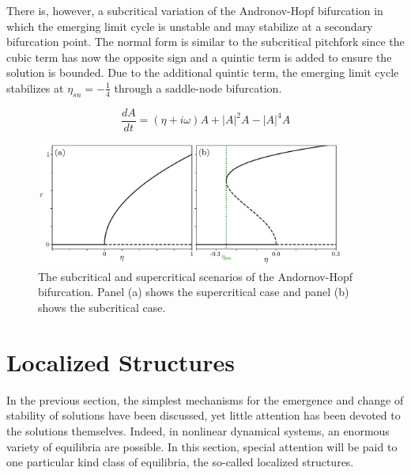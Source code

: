 There is, however, a subcritical variation
of the Andronov-Hopf bifurcation in which the emerging limit cycle is unstable and may stabilize at a secondary bifurcation point.
The normal form is similar to the subcritical pitchfork since the cubic term has now the opposite sign and a quintic term is added to ensure the solution is bounded.
Due to the additional quintic term, the emerging limit cycle stabilizes at $\eta_{sn} = -\frac14$ through
a saddle-node bifurcation.

\begin{equation}
    \dfrac{dA}{dt} = (\eta + i\omega) A + |A|^2 A - |A|^4A
\end{equation}

\begin{figure}[h]
    \centering
    \includegraphics[width=0.9\textwidth]{imagenes/framework/hopf_supersub.pdf}
    \caption{The subcritical and supercritical scenarios of the Andornov-Hopf
    bifurcation. Panel (a) shows the supercritical case and panel (b) shows the subcritical
    case.}
\end{figure}

\section{Localized Structures}
\label{sec:fra_LS}

In the previous section, the simplest mechanisms for the emergence and
change of stability of solutions have been discussed, yet little attention
has been devoted to the solutions themselves. Indeed, in nonlinear dynamical
systems, an enormous variety of equilibria are possible. In this section,
special attention will be paid to one particular kind class of equilibria,
the so-called localized structures. 


